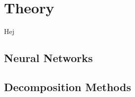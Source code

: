 \section{Theory} \label{tex:theory}
Hej

\subsection{Neural Networks}\label{tex:theory_NN}

\subsection{Decomposition Methods}\label{tex:decomp_methods}